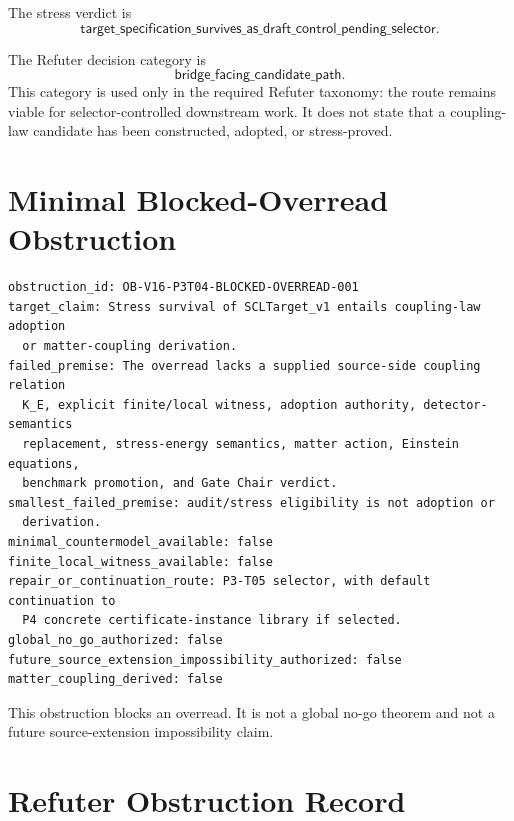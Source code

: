\documentclass[11pt]{article}
\newcommand{\StressVerdict}{\mathsf{target\_specification\_survives\_as\_draft\_control\_pending\_selector}}
\begin{document}
The stress verdict is
\[
  \StressVerdict .
\]

The Refuter decision category is
\[
  \mathsf{bridge\_facing\_candidate\_path}.
\]
This category is used only in the required Refuter taxonomy: the route remains
viable for selector-controlled downstream work. It does not state that a
coupling-law candidate has been constructed, adopted, or stress-proved.

\section{Minimal Blocked-Overread Obstruction}

\begin{verbatim}
obstruction_id: OB-V16-P3T04-BLOCKED-OVERREAD-001
target_claim: Stress survival of SCLTarget_v1 entails coupling-law adoption
  or matter-coupling derivation.
failed_premise: The overread lacks a supplied source-side coupling relation
  K_E, explicit finite/local witness, adoption authority, detector-semantics
  replacement, stress-energy semantics, matter action, Einstein equations,
  benchmark promotion, and Gate Chair verdict.
smallest_failed_premise: audit/stress eligibility is not adoption or
  derivation.
minimal_countermodel_available: false
finite_local_witness_available: false
repair_or_continuation_route: P3-T05 selector, with default continuation to
  P4 concrete certificate-instance library if selected.
global_no_go_authorized: false
future_source_extension_impossibility_authorized: false
matter_coupling_derived: false
\end{verbatim}

This obstruction blocks an overread. It is not a global no-go theorem and not
a future source-extension impossibility claim.

\section{Refuter Obstruction Record}
\end{document}
